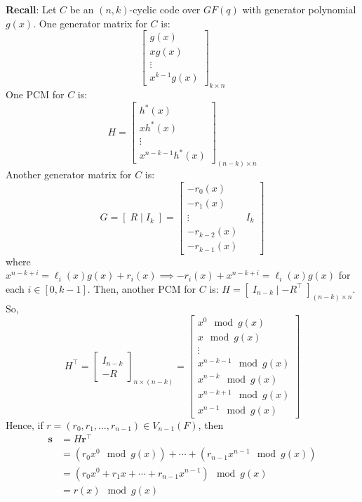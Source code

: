 \textbf{Recall}: Let $ C $ be an $ (n,k) $-cyclic code over $ GF(q) $ with generator
polynomial $ g(x) $. One generator matrix for $ C $ is:
\[
    \begin{bmatrix}
        g(x)   \\
        xg(x)  \\
        \vdots \\
        x^{k-1}g(x)
    \end{bmatrix}_{k\times n} \]
One PCM for $ C $ is:
\[ H=
    \begin{bmatrix}
        h^*(x)  \\
        xh^*(x) \\
        \vdots  \\
        x^{n-k-1}h^*(x)
    \end{bmatrix}_{(n-k)\times n} \]
Another generator matrix for $ C $ is:
\[ G=\left[ \; R\mid I_k\; \right]=
    \left[ \begin{array}{c|c}
            -r_0(x)      \\
            -r_1(x)      \\
            \vdots & I_k \\
            -r_{k-2}(x)  \\
            -r_{k-1}(x)
        \end{array} \right] \]
where $ x^{n-k+i}=\ell_i(x)g(x)+r_i(x)\implies -r_i(x)+x^{n-k+i}=\ell_i(x)g(x) $ for each $ i\in[0,k-1] $.
Then, another PCM for $ C $ is: $ H=\left[ \; I_{n-k}\mid -R^\top \; \right]_{(n-k)\times n} $. So,
\[ H^\top=
    \begin{bmatrix}
        I_{n-k} \\
        -R
    \end{bmatrix}_{n\times (n-k)}
    =
    \begin{bmatrix}
        x^0\mod g(x)       \\
        x \mod g(x)        \\
        \vdots             \\
        x^{n-k-1}\mod g(x) \\
        x^{n-k}\mod g(x)   \\
        x^{n-k+1}\mod g(x) \\
        x^{n-1}\mod g(x)
    \end{bmatrix} \]
Hence, if $ r=(r_0,r_1,\ldots ,r_{n-1})\in V_{n-1}(F) $, then
\begin{align*}
    \bm{s}
     & =H\bm{r}^\top                                        \\
     & =(r_0 x^0\mod g(x))+\cdots+(r_{n-1}x^{n-1}\mod g(x)) \\
     & =(r_0x^0+r_1x+\cdots+r_{n-1}x^{n-1})\mod g(x)        \\
     & =r(x)\mod g(x)
\end{align*}

